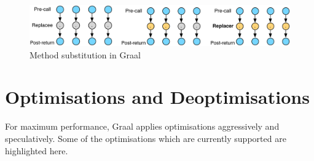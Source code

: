 \begin{figure}
	\centering
	\includegraphics[width=\textwidth]{graphics/graph-replacement.pdf}
	\caption{Method substitution in Graal}
	\label{fig:method-subs}
\end{figure}

\section{Optimisations and Deoptimisations} \label{sec:graal/deopt}	
For maximum performance, Graal applies optimisations aggressively and speculatively. Some of the optimisations which are currently supported are highlighted here.

